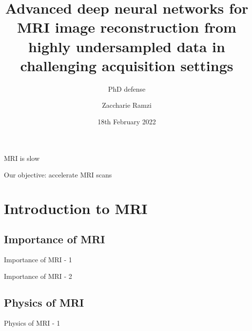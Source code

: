 \documentclass[aspectratio=169,xcolor=dvipsnames]{beamer}
\title[Advanced deep neural networks for MRI image reconstruction]{Advanced deep neural networks for MRI image reconstruction from highly undersampled data in challenging acquisition settings
} %
\subtitle{PhD defense}
\author[Zaccharie] {Zaccharie Ramzi}
\institute[Inria-CEA] %
{
    Parietal team, Inria Saclay \\
    NeuroSpin and Cosmostat, CEA Saclay
}
\date{18th February 2022} %
\begin{document}
\begin{frame}
    \titlepage
\end{frame}


\begin{frame}
\end{frame}

\begin{frame}{MRI is slow}
\end{frame}

\begin{frame}{Our objective: accelerate MRI scans}
\end{frame}

\section{Introduction to MRI}
\subsection{Importance of MRI}
\begin{frame}{Importance of MRI - 1}
\end{frame}

\begin{frame}{Importance of MRI - 2}
\end{frame}

\subsection{Physics of MRI}
\begin{frame}{Physics of MRI - 1}
\end{frame}
\end{document}
